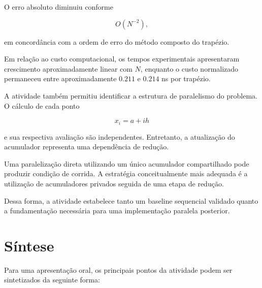 O erro absoluto diminuiu conforme

\begin{equation}
    O(N^{-2}),
\end{equation}

em concordância com a ordem de erro do método composto do trapézio.

Em relação ao custo computacional, os tempos experimentais apresentaram
crescimento aproximadamente linear com \(N\), enquanto o custo normalizado
permaneceu entre aproximadamente \(0.211\) e \(0.214\) ns por trapézio.

A atividade também permitiu identificar a estrutura de paralelismo do
problema. O cálculo de cada ponto

\begin{equation}
    x_i=a+ih
\end{equation}

e sua respectiva avaliação são independentes. Entretanto, a atualização do
acumulador representa uma dependência de redução.

Uma paralelização direta utilizando um único acumulador compartilhado pode
produzir condição de corrida. A estratégia conceitualmente mais adequada é
a utilização de acumuladores privados seguida de uma etapa de redução.

Dessa forma, a atividade estabelece tanto um baseline sequencial validado
quanto a fundamentação necessária para uma implementação paralela posterior.


\section{Síntese}

\label{sec:atvd04-defesa}

Para uma apresentação oral, os principais pontos da atividade podem ser
sintetizados da seguinte forma:

